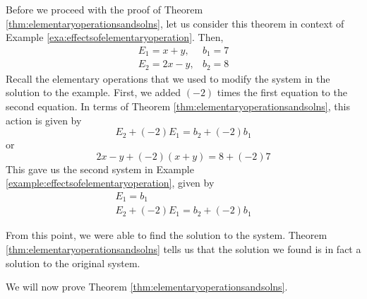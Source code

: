Before we proceed with the proof of Theorem \ref{thm:elementaryoperationsandsolns}, 
let us consider this theorem in context of Example \ref{exa:effectsofelementaryoperation}. Then,
\begin{equation*}
\begin{array}{cc}
E_{1} = x+y, & b_{1} = 7 \\
E_{2} = 2x-y, & b_{2} = 8 
\end{array}
\end{equation*}
Recall the elementary operations that we used to modify the system in the solution to the example. 
First, we added $\left( -2 \right)$ times the first equation to the second equation.
In terms of Theorem \ref{thm:elementaryoperationsandsolns}, this action is given by
\begin{equation*}
E_{2} + \left( -2 \right) E_{1} = b_{2} + \left( -2 \right)b_{1}
\end{equation*}
or
\begin{equation*}
2x-y + \left( -2 \right) \left(x+y \right) = 8 + \left( -2 \right) 7
\end{equation*}
This gave us the second system in Example \ref{example:effectsofelementaryoperation}, given by 
\begin{equation*}
\begin{array}{c}
E_{1} = b_{1} \\
E_{2} + \left( -2 \right) E_{1} = b_{2} + \left( -2 \right) b_{1}
\end{array}
\end{equation*}

From this point, we were able to 
find the solution to the system. Theorem \ref{thm:elementaryoperationsandsolns} tells us that the solution we 
found is in fact a solution to the original system.

\ifdefined\showproofs
We will now prove Theorem \ref{thm:elementaryoperationsandsolns}.

